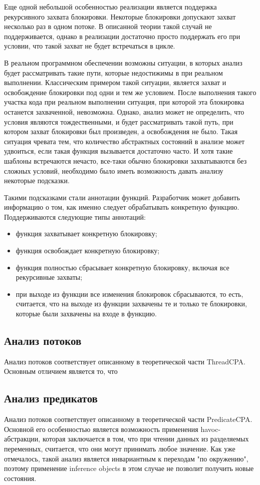 Еще одной небольшой особенностью реализации является поддержка рекурсивного захвата блокировки. 
Некоторые блокировки допускают захват несколько раз в одном потоке.
В описанной теории такой случай не поддерживается, однако в реализации достаточно просто поддержать его при условии, что такой захват не будет встречаться в цикле.

В реальном программном обеспечении возможны ситуации, в которых анализ будет рассматривать такие пути, которые недостижимы в при реальном выполнении.
Классическим примером такой ситуации, является захват и освобождение блокировки под одни и тем же условием. 
После выполнения такого участка кода при реальном выполнении ситуация, при которой эта блокировка останется захваченной, невозможна.
Однако, анализ может не определить, что условия являются тождественными, и будет рассматривать такой путь, при котором захват блокировки был произведен, а освобождения не было.
Такая ситуация чревата тем, что количество абстрактных состояний в анализе может удвоиться, если такая функция вызывается достаточно часто.
И хотя такие шаблоны встречаются нечасто, все-таки обычно блокировки захватываются без сложных условий, необходимо было иметь возможность давать анализу некоторые подсказки.

Такими подсказками стали аннотации функций.
Разработчик может добавить информацию о том, как именно следует обрабатывать конкретную функцию.
Поддерживаются следующие типы аннотаций:
\begin{itemize}
\item функция захватывает конкретную блокировку;
\item функция освобождает конкретную блокировку;
\item функция полностью сбрасывает конкретную блокировку, включая все рекурсивные захваты;
\item при выходе из функции все изменения блокировок сбрасываются, то есть, считается, что на выходе из функции захвачены те и только те блокировки, которые были захвачены на входе в функцию.
\end{itemize}

\subsection{Анализ потоков}
Анализ потоков соответствует описанному в теоретической части ThreadCPA.
Основным отличием является то, что 

\subsection{Анализ предикатов}
Анализ потоков соответствует описанному в теоретической части PredicateCPA.
Основной его особенностью является возможность применения havoc-абстракции, которая заключается в том, что при чтении данных из разделяемых переменных, считается, что они могут принимать любое значение.
Как уже отмечалось, такой анализ является инвариантным к переходам "по окружению", поэтому применение inference objects в этом случае не позволит получить новые состояния.

